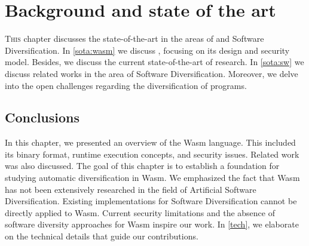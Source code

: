 \chapter{Background and state of the art}
\label{SOTA}



\lettrine[lines=3]{T}{his} chapter discusses the state-of-the-art in the areas of \Wasm and Software Diversification. 
In \autoref{sota:wasm} we discuss \Wasm, focusing on its design and security model.
Besides, we discuss the current state-of-the-art of \Wasm research.
In \autoref{sota:sw} we discuss related works in the area of Software Diversification.
Moreover, we delve into the open challenges regarding the diversification of \Wasm programs.






\section*{Conclusions}

In this chapter, we presented an overview of the Wasm language. 
This included its binary format, runtime execution concepts, and security issues. 
Related work was also discussed. 
The goal of this chapter is to establish a foundation for studying automatic diversification in Wasm. 
We emphasized the fact that Wasm has not been extensively researched in the field of Artificial Software Diversification. 
Existing implementations for Software Diversification cannot be directly applied to Wasm. 
Current security limitations and the absence of software diversity approaches for Wasm inspire our work. 
In \autoref{tech}, we elaborate on the technical details that guide our contributions.
